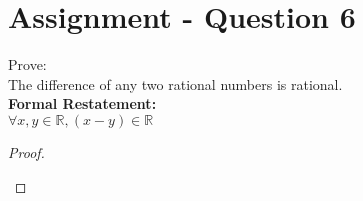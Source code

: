 \documentclass{article}
\begin{document}
\section*{Assignment - Question 6}
Prove:\\
The difference of any two rational numbers is rational.\\
\textbf{Formal Restatement:}\\
$\forall x,y \in \mathbb{R}, (x-y) \in \mathbb{R}$\\
\begin{proof}
  \begin{addmargin}{1em}
  \end{addmargin}
\end{proof}
\end{document}
